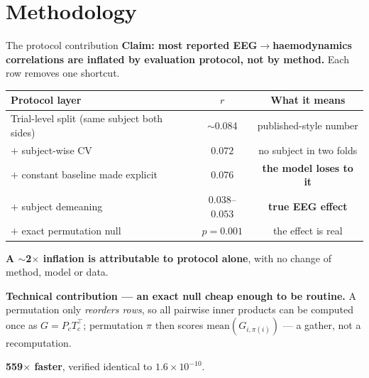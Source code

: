 \documentclass[aspectratio=169,11pt]{beamer}
\begin{document}
\section{Methodology}
\begin{frame}{The protocol contribution}
\textbf{Claim: most reported EEG$\rightarrow$haemodynamics correlations are
inflated by evaluation protocol, not by method.} Each row removes one shortcut.

\begin{center}\small
\begin{tabular}{lcc}
\toprule
Protocol layer & $r$ & What it means \\
\midrule
Trial-level split (same subject both sides) & $\sim$0.084 & published-style number \\
$+$ subject-wise CV & $0.072$ & no subject in two folds \\
$+$ constant baseline made explicit & $0.076$ & \textbf{the model loses to it} \\
$+$ subject demeaning & $\mathbf{0.038}$--$\mathbf{0.053}$ & \textbf{true EEG effect} \\
$+$ exact permutation null & $p=0.001$ & the effect is real \\
\bottomrule
\end{tabular}
\end{center}

\vspace{0.5em}
\textbf{A $\sim$2$\times$ inflation is attributable to protocol alone}, with no
change of method, model or data.

\vspace{0.5em}
\textbf{Technical contribution --- an exact null cheap enough to be routine.}
A permutation only \emph{reorders rows}, so all pairwise inner products can be
computed once as $G=P_cT_c^{\top}$; permutation $\pi$ then scores
$\text{mean}(G_{i,\pi(i)})$ --- a gather, not a recomputation.
\begin{center}
\textbf{559$\times$ faster}, verified identical to $1.6\times10^{-10}$.
\end{center}
\end{frame}
\end{document}

